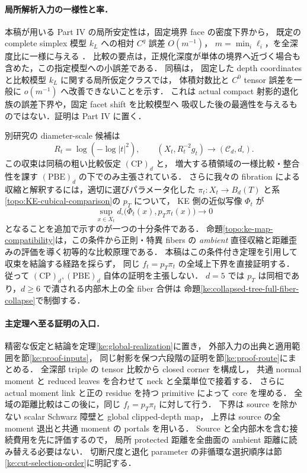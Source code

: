 \paragraph{局所解析入力の一様性と率．}\label{intro:local-stability-scope}
本稿が用いる Part IV の局所安定性は，固定境界 face の密度下界から，
既定の complete simplex 模型 $k_L$ への相対 $C^q$ 誤差 $O(m^{-1})$，
$m=\min_i\ell_i$，を全深度比に一様に与える
\cite[\texttt{coarse:thm:boundary-to-triple}]{KELocalCurrent}．
比較の要点は，正規化深度が単体の境界へ近づく場合も含めた，この指定模型への小誤差である．
同稿\cite[\texttt{simplex:prop:boundary-floor-sharpness}]{KELocalCurrent}は，
固定した depth coordinates と比較模型 $k_L$ に関する局所仮定クラスでは，
体積対数比と $C^0$ tensor 誤差を一般に $o(m^{-1})$ へ改善できないことを示す．
これは actual compact 射影的退化族の誤差下界や，固定 facet shift を比較模型へ
吸収した後の最適性を与えるものではない．証明は Part IV に置く．

別研究\cite{KECubicalCurrent}の diameter-scale 候補は
\[
 R_t=\log(-\log|t|^2),\qquad
 (X_t,R_t^{-2}g_t)\longrightarrow(\mathcal C_d,d_\square).
\]
この収束は同稿の粗い比較仮定 $\mathrm{(CP)}_d$ と，
増大する積領域の一様比較・整合性を課す $\mathrm{(PBE)}_d$ の下でのみ主張されている．
さらに我々の fibration による収縮と解釈するには，適切に選びパラメータ化した
$\pi_t:X_t\to B_d(T)$ と系\ref{topo:KE-cubical-comparison}の $p_T$ について，
KE 側の近似写像 $\Phi_t$ が
\[
 \sup_{x\in X_t}d_\square\bigl(\Phi_t(x),p_T\pi_t(x)\bigr)\longrightarrow0
\]
となることを追加で示すのが一つの十分条件である．
命題\ref{topo:ke-map-compatibility}は，この条件から正則・特異 fibers の
\emph{ambient} 直径収縮と距離歪みの評価を導く初等的な比較原理である．
本稿はこの条件付き定理を引用して収束を結論する経路を採らず，
同じ $f_t=p_T\pi_t$ の全域上下界を直接証明する．
従って $\mathrm{(CP)}_d,\mathrm{(PBE)}_d$ 自体の証明を主張しない．
$d=5$ では $p_T$ は同相であり，$d\ge6$ で潰される内部木上の全 fiber 合併は
命題\ref{ke:collapsed-tree-full-fiber-collapse}で制御する．

\paragraph{主定理へ至る証明の入口．}
精密な仮定と結論を定理\ref{ke:global-realization}に置き，
外部入力の出典と適用範囲を節\ref{ke:proof-inputs}，
同じ射影を保つ六段階の証明を節\ref{ke:proof-route}にまとめる．
全深部 triple の tensor 比較から closed corner を構成し，
共通 normal moment と reduced leaves を合わせて neck と全葉単位で接着する．
さらに actual moment link と正の residue を持つ primitive によって core を埋める．
全域の距離比較はこの後に，同じ $f_t=p_T\pi_t$ に対して行う．
下界は source を除かない scalar Schwarz 障壁と global clipped-depth map，
上界は source の全 moment 退出と共通 moment の portals を用いる．
Source と全内部木を含む接続費用を先に評価するので，
局所 protected 距離を全曲面の ambient 距離に読み替える必要はない．
切断尺度と退化 parameter の非循環な選択順序は節\ref{ke:cut-selection-order}に明記する．

